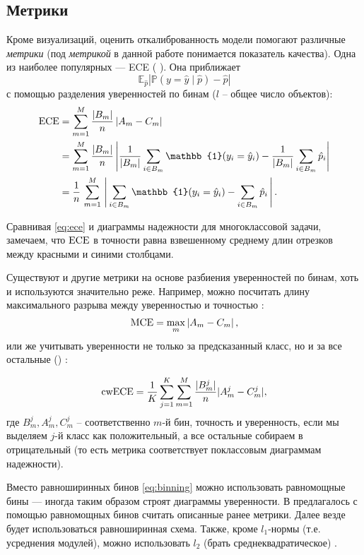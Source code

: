 \documentclass[12pt]{article}
\begin{document}
\subsection{Метрики}
Кроме визуализаций, оценить откалиброванность модели помогают различные \emph{метрики} (под \emph{метрикой} в данной работе понимается показатель качества). Одна из наиболее популярных --- ECE ( \cite{bayesian_ece}). Она приближает
$$
\mathbb{E}_{\hat{p}}\left|
\mathbb{P}\left(y=\hat{y}\mid \hat{p}\right)-\hat{p}\right|
$$
с помощью разделения уверенностей по бинам ($l$ -- общее число объектов):
\begin{align}\label{eq:ece}
\ece &=
\sum_{m=1}^{M}
\frac{|B_m|}{n}
\left| A_m - C_m \right| \\
&=
\sum_{m=1}^{M}
\frac{|B_m|}{n}\left|
\frac{1}{|B_m|}\sum_{i\in B_m} \mathbb{1}(y_i=\hat{y}_i)
-
\frac{1}{|B_m|}\sum_{i\in B_m} \hat{p}_i
\right| \nonumber\\
&=
\frac{1}{n}\,\sum_{m=1}^{M}\,
\left|\,
\sum_{i\in B_m} \mathbb{1}(y_i=\hat{y}_i)
-
\sum_{i\in B_m} \hat{p}_i
\,\right|\nonumber.
\end{align}

Сравнивая \eqref{eq:ece} и диаграммы надежности для многоклассовой задачи, замечаем, что $\operatorname{ECE}$ в точности равна взвешенному среднему длин отрезков между красными и синими столбцами.

Существуют и другие метрики на основе разбиения уверенностей по бинам, хоть и используются значительно реже. Например, можно посчитать длину максимального разрыва между уверенностью и точностью \cite{bayesian_ece}:
\begin{equation}
    \operatorname{MCE}=\max_m \left|A_m - C_m\right|,
\end{equation}
или же учитывать уверенности не только за предсказанный класс, но и за все остальные () \cite{dirichlet}:

\begin{equation}\label{eq:cwece}
    \operatorname{cwECE}=\frac{1}{K}
\sum_{j=1}^K \sum_{m=1}^M
\frac{|B^j_m|}{n}|A^j_m - C^j_m|,
\end{equation}
где $B^j_m, A^j_m, C^j_m$ -- соответственно $m$-й бин, точность и уверенность, если мы выделяем $j$-й класс как положительный, а все остальные собираем в отрицательный (то есть метрика соответствует поклассовым диаграммам надежности).

Вместо равноширинных бинов \eqref{eq:binning} можно использовать равномощные бины --- иногда таким образом строят диаграммы уверенности. В \cite{ace} предлагалось с помощью равномощных бинов считать описанные ранее метрики. Далее везде будет использоваться равноширинная схема. Также, кроме $l_1$-нормы (т.е. усреднения модулей), можно использовать $l_2$ (брать среднеквадратическое) \cite{verified_uncertainty}.
\end{document}
